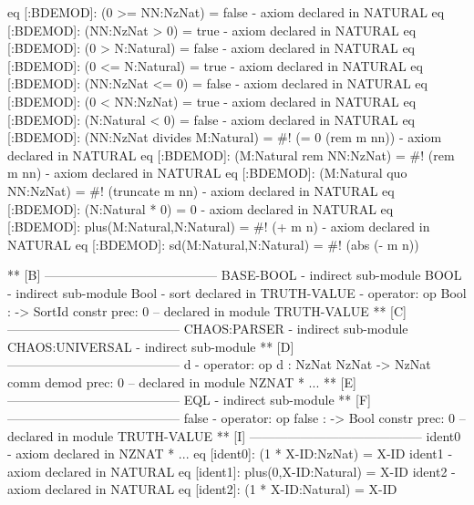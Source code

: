 \documentclass[a4paper,oneside,10pt]{memoir}
\newenvironment{vvtm}%
{\parskip=0pt\lineskip=0pt\begin{center}\begin{minipage}{0.8\textwidth}\begin{snugshade}}%
  {\end{snugshade}\end{minipage}\end{center}}
\begin{document}
  \begin{vvtm}
  \begin{examplev}
    eq [:BDEMOD]: (0 >= NN:NzNat) = false
  - axiom declared in NATURAL
    eq [:BDEMOD]: (NN:NzNat > 0) = true
  - axiom declared in NATURAL
    eq [:BDEMOD]: (0 > N:Natural) = false
  - axiom declared in NATURAL
    eq [:BDEMOD]: (0 <= N:Natural) = true
  - axiom declared in NATURAL
    eq [:BDEMOD]: (NN:NzNat <= 0) = false
  - axiom declared in NATURAL
    eq [:BDEMOD]: (0 < NN:NzNat) = true
  - axiom declared in NATURAL
    eq [:BDEMOD]: (N:Natural < 0) = false
  - axiom declared in NATURAL
    eq [:BDEMOD]: (NN:NzNat divides M:Natural)
     = #! (= 0 (rem m nn))
  - axiom declared in NATURAL
    eq [:BDEMOD]: (M:Natural rem NN:NzNat)
     = #! (rem m nn)
  - axiom declared in NATURAL
    eq [:BDEMOD]: (M:Natural quo NN:NzNat)
     = #! (truncate m nn)
  - axiom declared in NATURAL
    eq [:BDEMOD]: (N:Natural * 0) = 0
  - axiom declared in NATURAL
    eq [:BDEMOD]: plus(M:Natural,N:Natural)
     = #! (+ m n)
  - axiom declared in NATURAL
    eq [:BDEMOD]: sd(M:Natural,N:Natural)
     = #! (abs (- m n))
\end{examplev}
\end{vvtm}
\begin{vvtm}
\begin{examplev}
** [B] -----------------------------------------
BASE-BOOL 
  - indirect sub-module
BOOL      
  - indirect sub-module
Bool      
  - sort declared in TRUTH-VALUE
  - operator:
    op Bool : -> SortId { constr prec: 0 }
        -- declared in module TRUTH-VALUE
** [C] -----------------------------------------
CHAOS:PARSER 
  - indirect sub-module
CHAOS:UNIVERSAL 
  - indirect sub-module
** [D] -----------------------------------------
d         
  - operator:
    op d : NzNat NzNat -> NzNat { comm demod prec: 0 }
        -- declared in module NZNAT * { ... }
** [E] -----------------------------------------
EQL       
  - indirect sub-module
** [F] -----------------------------------------
false     
  - operator:
    op false : -> Bool { constr prec: 0 }
        -- declared in module TRUTH-VALUE
** [I] -----------------------------------------
ident0    
  - axiom declared in NZNAT * { ... }
    eq [ident0]: (1 * X-ID:NzNat) = X-ID
ident1    
  - axiom declared in NATURAL
    eq [ident1]: plus(0,X-ID:Natural)
     = X-ID
ident2    
  - axiom declared in NATURAL
    eq [ident2]: (1 * X-ID:Natural)
     = X-ID
\end{examplev}
\end{vvtm}
\end{document}
